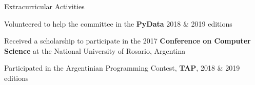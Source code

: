 \documentclass{curriculum}
\begin{document}

\begin{cvsection}{Extracurricular Activities}
    \begin{sectionitemlist}
        \item {Volunteered to help the committee in the \textbf{PyData} 2018 \& 2019 editions}
        \item {Received a scholarship to participate in the 2017 \textbf{Conference on Computer Science} at the National University of Rosario, Argentina}
        \item {Participated in the Argentinian Programming Contest, \textbf{TAP}, 2018 \& 2019 editions}
    \end{sectionitemlist}
\end{cvsection}

\end{document}
